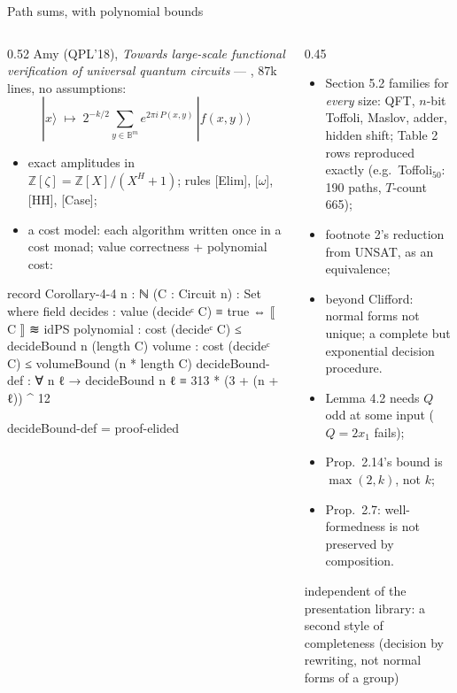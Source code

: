 \begin{frame}{Path sums, with polynomial bounds \New}
\begin{columns}[c]
\begin{column}{0.52\textwidth}
\renewcommand{\AgdaCodeStyle}{\scriptsize}
\small Amy (QPL'18), \emph{Towards large-scale functional verification of
universal quantum circuits} --- , 87k lines, \alert{no assumptions}:
\[
  |x\rangle \;\mapsto\; 2^{-k/2}\!\!\sum_{y\in\mathbb{B}^m}\! e^{2\pi i\,P(x,y)}\,|f(x,y)\rangle
\]
\vspace{-8pt}
\begin{itemize}
  \small
  \item exact amplitudes in $\mathbb{Z}[\zeta]=\mathbb{Z}[X]/(X^H+1)$;
        rules [Elim], [$\omega$], [HH], [Case];
  \item a \alert{cost model}: each algorithm written once in a cost monad;
        value correctness + polynomial cost:
\end{itemize}
\begin{code}
record Corollary-4-4 {n : ℕ} (C : Circuit n) : Set where
  field
    decides    : value (decideᶜ C) ≡ true ⇔ ⟦ C ⟧ ≋ idPS
    polynomial : cost (decideᶜ C) ≤ decideBound n (length C)
    volume     : cost (decideᶜ C) ≤ volumeBound (n * length C)
decideBound-def : ∀ n ℓ → decideBound n ℓ ≡ 313 * (3 + (n + ℓ)) ^ 12
\end{code}
\begin{code}[hide]
decideBound-def = proof-elided
\end{code}
\end{column}
\begin{column}{0.45\textwidth}
\footnotesize
\begin{itemize}
  \setlength{\itemsep}{2pt}
  \item Section 5.2 families for \emph{every} size: QFT, $n$-bit Toffoli, Maslov,
        adder, hidden shift; Table 2 rows reproduced exactly (e.g.\ Toffoli$_{50}$:
        190 paths, $T$-count 665);
  \item footnote 2's reduction from UNSAT, as an equivalence;
  \item beyond Clifford: normal forms \alert{not unique}; a complete but
        exponential decision procedure.
\end{itemize}
\begin{keybox}[title={Errata in the paper, each with a checked counterexample}]
\footnotesize
\begin{itemize}
  \item Lemma 4.2 needs $Q$ odd at some input ($Q=2x_1$ fails);
  \item Prop.\ 2.14's bound is $\max(2,k)$, not $k$;
  \item Prop.\ 2.7: well-formedness is not preserved by composition.
\end{itemize}
\end{keybox}
{\scriptsize independent of the presentation library: a second style of completeness
(decision by rewriting, not normal forms of a group)}
\end{column}
\end{columns}
\end{frame}

